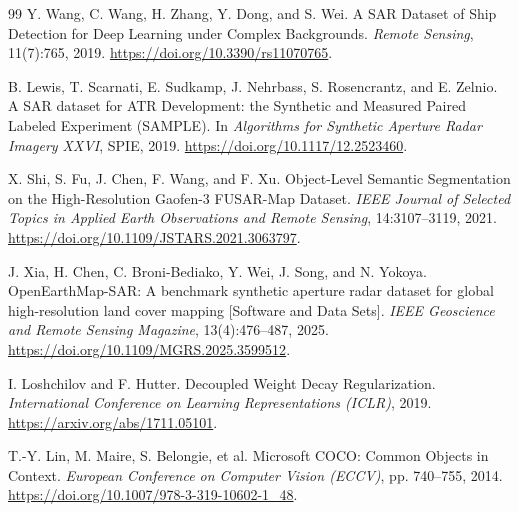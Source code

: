 \documentclass[UTF8,11pt,a4paper,fontset=fandol]{ctexart}
\begin{document}
\begin{thebibliography}{99}
Y. Wang, C. Wang, H. Zhang, Y. Dong, and S. Wei.
A SAR Dataset of Ship Detection for Deep Learning under Complex Backgrounds.
\emph{Remote Sensing}, 11(7):765, 2019.
\url{https://doi.org/10.3390/rs11070765}.

B. Lewis, T. Scarnati, E. Sudkamp, J. Nehrbass, S. Rosencrantz, and E. Zelnio.
A SAR dataset for ATR Development: the Synthetic and Measured Paired Labeled Experiment (SAMPLE).
In \emph{Algorithms for Synthetic Aperture Radar Imagery XXVI}, SPIE, 2019.
\url{https://doi.org/10.1117/12.2523460}.

X. Shi, S. Fu, J. Chen, F. Wang, and F. Xu.
Object-Level Semantic Segmentation on the High-Resolution Gaofen-3 FUSAR-Map Dataset.
\emph{IEEE Journal of Selected Topics in Applied Earth Observations and Remote Sensing},
14:3107--3119, 2021.
\url{https://doi.org/10.1109/JSTARS.2021.3063797}.

J. Xia, H. Chen, C. Broni-Bediako, Y. Wei, J. Song, and N. Yokoya.
OpenEarthMap-SAR: A benchmark synthetic aperture radar dataset for global high-resolution land cover mapping [Software and Data Sets].
\emph{IEEE Geoscience and Remote Sensing Magazine}, 13(4):476--487, 2025.
\url{https://doi.org/10.1109/MGRS.2025.3599512}.

I. Loshchilov and F. Hutter.
Decoupled Weight Decay Regularization.
\emph{International Conference on Learning Representations (ICLR)}, 2019.
\url{https://arxiv.org/abs/1711.05101}.

T.-Y. Lin, M. Maire, S. Belongie, et al.
Microsoft COCO: Common Objects in Context.
\emph{European Conference on Computer Vision (ECCV)}, pp. 740--755, 2014.
\url{https://doi.org/10.1007/978-3-319-10602-1_48}.
\end{thebibliography}
\end{document}
